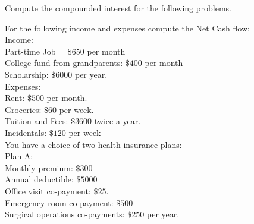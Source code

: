 \documentclass[11pt]{exam}
\begin{document}
\begin{questions}
\begin{parts}
\end{parts}



\newpage
\addpoints
\question[10] Compute the compounded interest for the following problems.


\noaddpoints %
\vspace{10cm}
\question[10] For the following income and expenses compute the Net Cash flow: \\
Income:\\
Part-time Job = $\$650$ per month\\
College fund from grandparents: $\$400$ per month\\
Scholarship: $\$6000$ per year. \\

Expenses: \\
Rent: $\$500$ per month.\\
Groceries: $\$60 $ per week.\\ 
Tuition and Fees: $\$3600$ twice a year.\\
Incidentals: $\$120$ per week \\

\vspace{10cm}
\question[15] You have a choice of two health insurance plans: \\ 
Plan A:\\
Monthly premium:   $\$300$ \\
Annual deductible:   $\$5000$ \\
Office visit  co-payment: $\$25$. \\
Emergency room co-payment: $\$500$ \\
Surgical operations co-payments: $\$250$ per year. \\


\end{questions}
\end{document}
